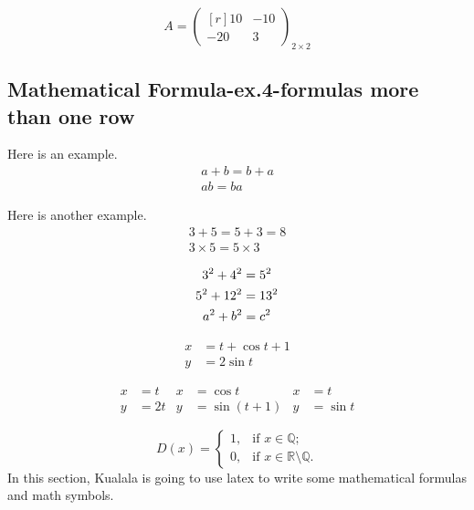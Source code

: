 \[
    A = \begin{pmatrix*}[r]
            10 & -10 \\ -20 & 3
        \end{pmatrix*}_{2\times 2}
\]

\subsection{Mathematical Formula-ex.4-formulas more than one row}
Here is an example.
\begin{gather}  %
    a+b = b+a   \\
    ab = ba
\end{gather}

Here is another example.
\begin{gather*} %
    3+5 = 5+3 = 8   \\
    3\times 5 = 5\times 3
\end{gather*}

\begin{gather}
    3^2 + 4^2 = 5^2 \notag \\ %
    5^2 + 12^2 = 13^2 \notag \\ %
    a^2 + b^2 = c^2
\end{gather}    

\begin{align}
    x &= t + \cos t + 1 \\
    y &= 2 \sin t
\end{align}

\begin{align*}
    x &=t  & x &= \cos t    & x & = t \\
    y &=2t & y &= \sin(t+1) & y & = \sin t
\end{align*}

\begin{equation}
    \label{eq:dakuohao}
    D(x) = \begin{cases}
    1, & \text{if } x \in \mathbb{Q}; \\
    0, & \text{if } x \in \mathbb{R}\setminus\mathbb{Q}.
    \end{cases}
\end{equation}In this section, Kualala is going to use latex to write some mathematical formulas and math symbols.

